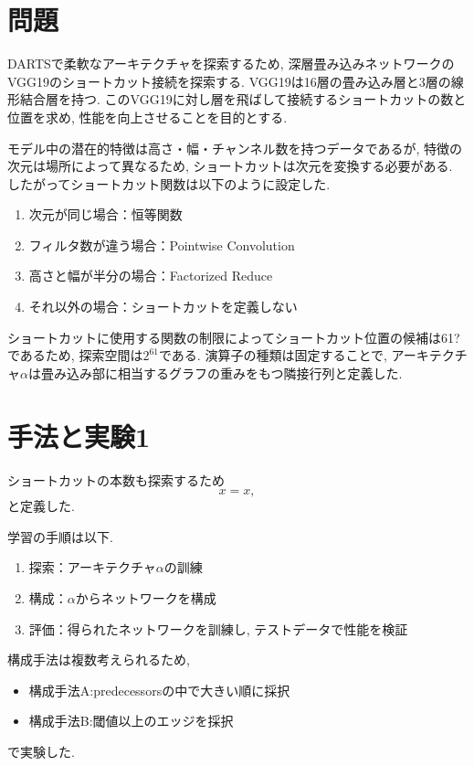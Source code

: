 \documentclass[twocolumn]{jarticle}     %
\begin{document}
\section{問題}
DARTSで柔軟なアーキテクチャを探索するため,
深層畳み込みネットワークのVGG19\cite{Simonyan15}のショートカット接続を探索する.
VGG19は16層の畳み込み層と3層の線形結合層を持つ.
このVGG19に対し層を飛ばして接続するショートカットの数と位置を求め,
性能を向上させることを目的とする.

モデル中の潜在的特徴は高さ・幅・チャンネル数を持つデータであるが,
特徴の次元は場所によって異なるため, ショートカットは次元を変換する必要がある.
したがってショートカット関数は以下のように設定した.
\begin{enumerate}
  \item 次元が同じ場合：恒等関数
  \item フィルタ数が違う場合：Pointwise Convolution
  \item 高さと幅が半分の場合：Factorized Reduce
  \item それ以外の場合：ショートカットを定義しない
\end{enumerate}
ショートカットに使用する関数の制限によってショートカット位置の候補は61?であるため,
探索空間は$2^{61}$である.
演算子の種類は固定することで, アーキテクチャ$\alpha$は畳み込み部に相当するグラフの重みをもつ隣接行列と定義した.

\section{手法と実験1}

ショートカットの本数も探索するため
\begin{equation}
  x = x,
\end{equation}
と定義した.

学習の手順は以下.
\begin{enumerate}
  \item 探索：アーキテクチャ$\alpha$の訓練
  \item 構成：$\alpha$からネットワークを構成
  \item 評価：得られたネットワークを訓練し, テストデータで性能を検証
\end{enumerate}

構成手法は複数考えられるため,
\begin{itemize}
  \item 構成手法A:predecessorsの中で大きい順に採択
  \item 構成手法B:閾値以上のエッジを採択
\end{itemize}
で実験した.
\end{document}
